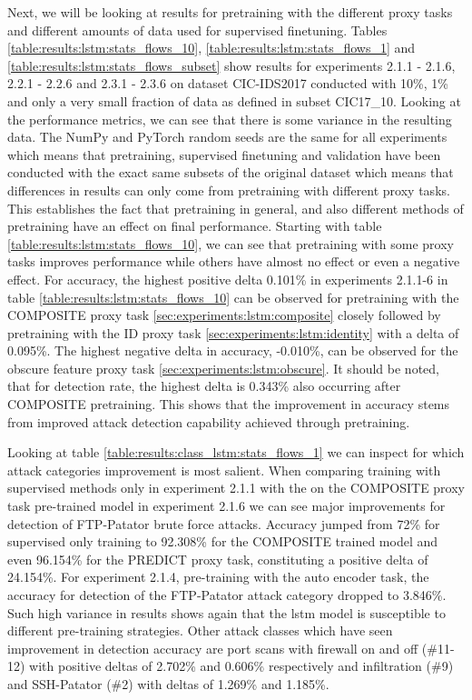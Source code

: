 

Next, we will be looking at results for pretraining with the different proxy tasks and different amounts of data used for supervised finetuning. Tables \ref{table:results:lstm:stats_flows_10}, \ref{table:results:lstm:stats_flows_1} and \ref{table:results:lstm:stats_flows_subset} show results for experiments 2.1.1 - 2.1.6, 2.2.1 - 2.2.6 and 2.3.1 - 2.3.6 on dataset CIC-IDS2017 conducted with 10\%, 1\% and only a very small fraction of data as defined in subset CIC17\_10. Looking at the performance metrics, we can see that there is some variance in the resulting data. The NumPy and PyTorch random seeds are the same for all experiments which means that pretraining, supervised finetuning and validation have been conducted with the exact same subsets of the original dataset which means that differences in results can only come from pretraining with different proxy tasks. This establishes the fact that pretraining in general, and also different methods of pretraining have an effect on final performance. Starting with table \ref{table:results:lstm:stats_flows_10}, we can see that pretraining with some proxy tasks improves performance while others have almost no effect or even a negative effect.
For accuracy, the highest positive delta 0.101\% in experiments 2.1.1-6 in table \ref{table:results:lstm:stats_flows_10} can be observed for pretraining with the COMPOSITE proxy task \ref{sec:experiments:lstm:composite} closely followed by pretraining with the ID proxy task \ref{sec:experiments:lstm:identity} with a delta of 0.095\%. The highest negative delta in accuracy, -0.010\%, can be observed for the obscure feature proxy task \ref{sec:experiments:lstm:obscure}. It should be noted, that for detection rate, the highest delta is 0.343\% also occurring after COMPOSITE pretraining. This shows that the improvement in accuracy stems from improved attack detection capability achieved through pretraining. \par
Looking at table \ref{table:results:class_lstm:stats_flows_1} we can inspect for which attack categories improvement is most salient. When comparing training with supervised methods only in experiment 2.1.1 with the on the COMPOSITE proxy task pre-trained model in experiment 2.1.6 we can see major improvements for detection of FTP-Patator brute force attacks. Accuracy jumped from 72\% for supervised only training to 92.308\% for the COMPOSITE trained model and even 96.154\% for the PREDICT proxy task, constituting a positive delta of 24.154\%. For experiment 2.1.4, pre-training with the auto encoder task, the accuracy for detection of the FTP-Patator attack category dropped to 3.846\%. Such high variance in results shows again that the \gls{lstm} model is susceptible to different pre-training strategies. Other attack classes which have seen improvement in detection accuracy are port scans with firewall on and off (\#11-12) with positive deltas of 2.702\% and 0.606\% respectively and infiltration (\#9) and SSH-Patator (\#2) with deltas of 1.269\% and 1.185\%. \par
